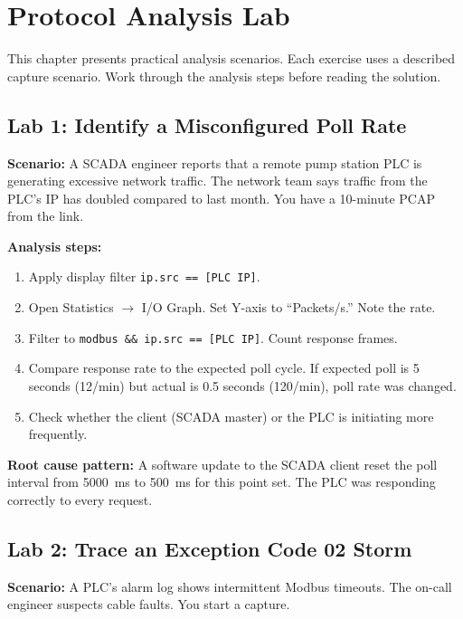 \documentclass[12pt,twoside,openright]{memoir}
\newcommand{\filter}[1]{\texttt{\color{wsblue}#1}}
\begin{document}
\chapter{Protocol Analysis Lab}

This chapter presents practical analysis scenarios. Each exercise uses a described capture scenario. Work through the analysis steps before reading the solution.

\section{Lab 1: Identify a Misconfigured Poll Rate}

\textbf{Scenario:} A SCADA engineer reports that a remote pump station PLC is generating excessive network traffic. The network team says traffic from the PLC's IP has doubled compared to last month. You have a 10-minute PCAP from the link.

\textbf{Analysis steps:}
\begin{enumerate}[noitemsep]
  \item Apply display filter \filter{ip.src == [PLC IP]}.
  \item Open Statistics $\to$ I/O Graph. Set Y-axis to ``Packets/s.'' Note the rate.
  \item Filter to \filter{modbus \&\& ip.src == [PLC IP]}. Count response frames.
  \item Compare response rate to the expected poll cycle. If expected poll is 5 seconds (12/min) but actual is 0.5 seconds (120/min), poll rate was changed.
  \item Check whether the client (SCADA master) or the PLC is initiating more frequently.
\end{enumerate}

\textbf{Root cause pattern:} A software update to the SCADA client reset the poll interval from 5000~ms to 500~ms for this point set. The PLC was responding correctly to every request.

\section{Lab 2: Trace an Exception Code 02 Storm}

\textbf{Scenario:} A PLC's alarm log shows intermittent Modbus timeouts. The on-call engineer suspects cable faults. You start a capture.
\end{document}
